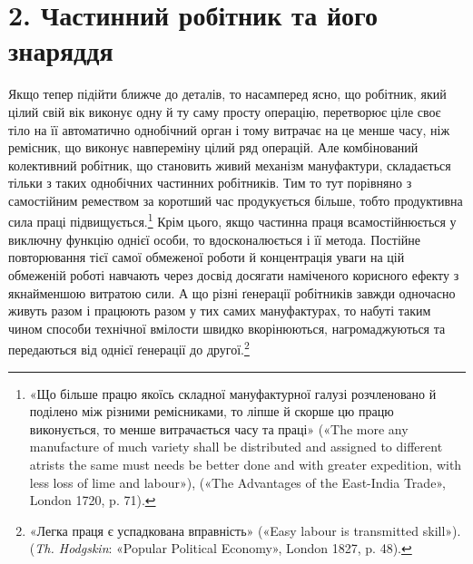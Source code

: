 \section*{2. Частинний робітник та його знаряддя}

Якщо тепер підійти ближче до деталів, то насамперед ясно,
що робітник, який цілий свій вік виконує одну й ту саму просту
операцію, перетворює ціле своє тіло на її автоматично однобічний
орган і тому витрачає на це менше часу, ніж ремісник, що
виконує навпереміну цілий ряд операцій. Але комбінований
колективний робітник, що становить живий механізм мануфактури,
складається тільки з таких однобічних частинних робітників.
Тим то тут порівняно з самостійним ремеством за коротший
час продукується більше, тобто продуктивна сила праці підвищується.\footnote{
«Що більше працю якоїсь складної мануфактурної галузі розчленовано
й поділено між різними ремісниками, то ліпше й скорше цю працю виконується,
то менше витрачається часу та праці» («The more any manufacture
of much variety shall be distributed and assigned to different atrists
the same must needs be better done and with greater expedition, with less
loss of lime and labour»), («The Advantages of the East-India Trade»,
London 1720, p. 71).
}
Крім цього, якщо частинна праця всамостійнюється
у виключну функцію однієї особи, то вдосконалюється і її метода.
Постійне повторювання тієї самої обмеженої роботи й концентрація
уваги на цій обмеженій роботі навчають через досвід досягати
наміченого корисного ефекту з якнайменшою витратою сили.
А що різні ґенерації робітників завжди одночасно живуть разом
і працюють разом у тих самих мануфактурах, то набуті таким
чином способи технічної вмілости швидко вкорінюються, нагромаджуються
та передаються від однієї ґенерації до другої.\footnote{
«Легка праця є успадкована вправність» («Easy labour is transmitted
skill»). (\emph{Th. Hodgskin}: «Popular Political Economy», London 1827, p. 48).
}

